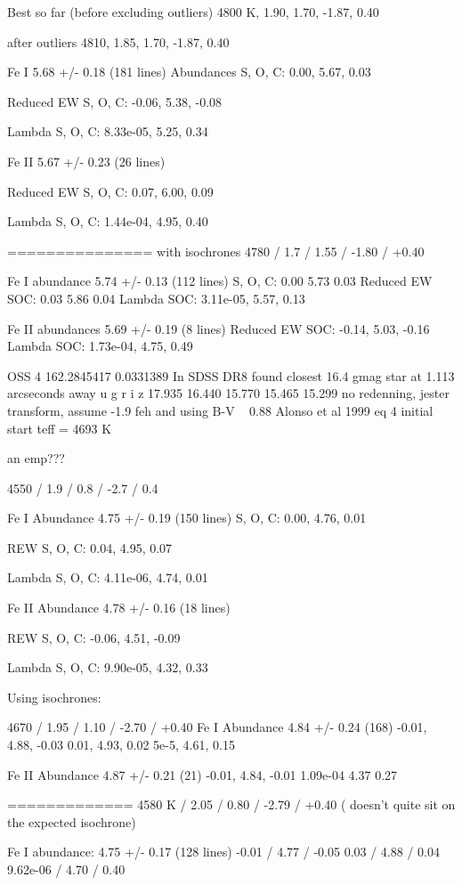 \documentclass{emulateapj}
\begin{document}
Best so far (before excluding outliers)
4800 K, 1.90, 1.70, -1.87, 0.40

after outliers
4810, 1.85, 1.70, -1.87, 0.40

Fe I 5.68 +/- 0.18 (181 lines)
Abundances
S, O, C: 0.00, 5.67, 0.03

Reduced EW
S, O, C: -0.06, 5.38, -0.08

Lambda S, O, C: 8.33e-05, 5.25, 0.34

Fe II 5.67 +/- 0.23 (26 lines)

Reduced EW S, O, C: 0.07, 6.00, 0.09

Lambda S, O, C: 1.44e-04, 4.95, 0.40


===============
with isochrones
4780 / 1.7 / 1.55 / -1.80 / +0.40

Fe I abundance 5.74 +/- 0.13 (112 lines)
S, O, C: 0.00 5.73 0.03
Reduced EW SOC: 0.03 5.86 0.04
Lambda SOC: 3.11e-05, 5.57, 0.13

Fe II abundances 5.69 +/- 0.19 (8 lines)
Reduced EW SOC: -0.14, 5.03, -0.16
Lambda SOC: 1.73e-04, 4.75, 0.49



OSS 4
162.2845417 0.0331389
In SDSS DR8 found closest 16.4 gmag star at 1.113 arcseconds away
u g r i z
17.935 16.440 15.770 15.465 15.299
no redenning, jester transform, assume -1.9 feh and using B-V ~ 0.88
Alonso et al 1999 eq 4
initial start teff = 4693 K

an emp???

4550 /  1.9 / 0.8 / -2.7 / 0.4

Fe I Abundance 4.75 +/- 0.19 (150 lines)
S, O, C: 0.00, 4.76, 0.01

REW S, O, C: 0.04, 4.95, 0.07

Lambda S, O, C: 4.11e-06, 4.74, 0.01

Fe II Abundance 4.78 +/- 0.16 (18 lines)

REW S, O, C: -0.06, 4.51, -0.09

Lambda S, O, C: 9.90e-05, 4.32, 0.33

Using isochrones:

4670 / 1.95 / 1.10 / -2.70 / +0.40
Fe I Abundance 4.84 +/- 0.24 (168)
-0.01, 4.88, -0.03
0.01, 4.93, 0.02
5e-5, 4.61, 0.15

Fe II Abundance 4.87 +/- 0.21 (21)
-0.01, 4.84, -0.01
1.09e-04 4.37 0.27

=============
4580 K / 2.05 / 0.80 / -2.79 / +0.40
( doesn't quite sit on the expected isochrone)

Fe I abundance: 4.75 +/- 0.17 (128 lines)
-0.01 / 4.77 / -0.05
0.03 / 4.88 / 0.04
9.62e-06 / 4.70 / 0.40
\end{document}
